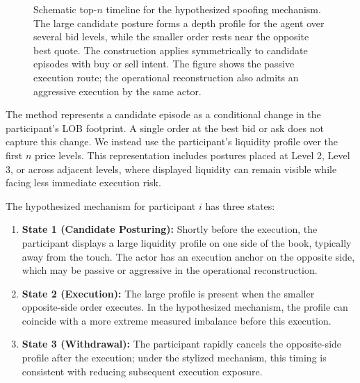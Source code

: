 \documentclass[11pt]{article}
\newenvironment{review}{\begingroup\color{blue}}{\endgroup}
\begin{document}
\begin{figure}[htbp]
{%
    }
    \caption{Schematic top-$n$ timeline for the hypothesized spoofing mechanism. The large candidate posture forms \begin{review}a depth profile for the agent\end{review} over several bid levels, while the smaller order rests near the opposite best quote. The
    construction applies symmetrically to \begin{review}candidate episodes with buy or sell intent\end{review}. The figure shows the passive execution
    route; the operational reconstruction also admits an aggressive execution by the same actor.}
    \label{fig:topn_spoofing_timeline}
\end{figure}

The method represents a candidate episode as a conditional change in the participant's LOB footprint. A single order at
the best bid or ask does not capture this change. We instead use the participant's liquidity profile over the first $n$
price levels. This representation includes postures placed at Level 2, Level 3, or across adjacent levels, where displayed
liquidity can remain visible while facing less immediate execution risk.

The hypothesized mechanism for participant $i$ has three states:
\begin{enumerate}
    \item \textbf{State 1 (Candidate Posturing):} Shortly before the execution, the participant displays a large
    liquidity profile on one side of the book, typically away from the touch. The actor has \begin{review}an execution anchor on the opposite side\end{review}, which may be passive or aggressive in the operational reconstruction.
    \item \textbf{State 2 (Execution):} The large profile is present when the smaller opposite-side order executes. In the
    hypothesized mechanism, the profile can coincide with a more extreme measured imbalance before this execution.
    \item \textbf{State 3 (Withdrawal):} The participant rapidly cancels the opposite-side profile after the execution;
    under the stylized mechanism, this timing is consistent with reducing subsequent execution exposure.
\end{enumerate}
\end{document}
